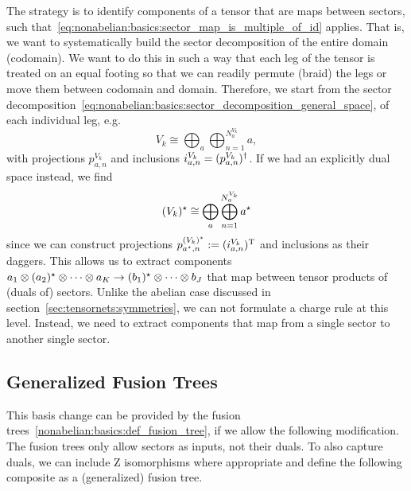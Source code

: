 The strategy is to identify components of a tensor that are maps between sectors, such that~\eqref{eq:nonabelian:basics:sector_map_is_multiple_of_id} applies.
%
That is, we want to systematically build the sector decomposition of the entire domain (codomain).
%
We want to do this in such a way that each leg of the tensor is treated on an equal footing so that we can readily permute (braid) the legs or move them between codomain and domain.
%
Therefore, we start from the sector decomposition~\eqref{eq:nonabelian:basics:sector_decomposition_general_space}, of each individual leg, e.g.
\begin{equation}
    \label{eq:nonabelian:tensors:leg_sector_decomposition}
    V_k \cong \bigoplus_{a} \bigoplus_{n=1}^{N^{V_k}_{a}} a
    ,
\end{equation}
with projections $p^{V_k}_{a,n}$ and inclusions $i^{V_k}_{a,n} = (p^{V_k}_{a,n})^\dagger$.
%
If we had an explicitly dual space instead, we find
\begin{equation}
    \label{eq:nonabelian:tensors:leg_sector_decomposition_explicit_dual}
    (V_k)^\star \cong \bigoplus_{a} \bigoplus_{n=1}^{N^{V_k}_{a}} a^\star
\end{equation}
since we can construct projections $p^{(V_k)^\star}_{a^\star,n} := (i^{V_k}_{a,n})^{\text{T}}$ and inclusions as their daggers.
%
This allows us to extract components $a_1 \otimes (a_2)^\star \otimes \dots \otimes a_K \to (b_1)^\star \otimes \dots \otimes b_J$ that map between tensor products of (duals of) sectors.
%
Unlike the abelian case discussed in section~\ref{sec:tensornets:symmetries}, we can not formulate a charge rule at this level.
%
Instead, we need to extract components that map from a single sector to another single sector.

\clearpage
\subsection{Generalized Fusion Trees}
\label{subsec:nonabelian:tensors:generalized_fusion_trees}

This basis change can be provided by the fusion trees~\eqref{nonabelian:basics:def_fusion_tree},
if we allow the following modification.
%
The fusion trees only allow sectors as inputs, not their duals.
%
To also capture duals, we can include Z isomorphisms where appropriate and define the following composite as a (generalized) fusion tree.


